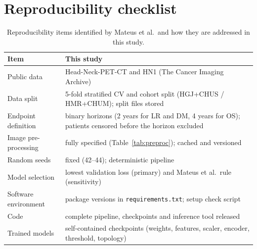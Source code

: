 \documentclass[11pt]{article}
\providecommand{\botrule}{\bottomrule}
\begin{document}
\section{Reproducibility checklist}

\begin{table}[!htb]
\centering\small
\caption{Reproducibility items identified by Mateus et al.\ and how they are addressed in this study.}\label{tab:checklist}
\begin{tabular}{@{}p{}p{}@{}}
\toprule
Item & This study \\
\midrule
Public data & Head-Neck-PET-CT and HN1 (The Cancer Imaging Archive) \\
Data split & 5-fold stratified CV and cohort split (HGJ+CHUS / HMR+CHUM); split files stored \\
Endpoint definition & binary horizons (2 years for LR and DM, 4 years for OS); patients censored before the horizon excluded \\
Image pre-processing & fully specified (Table~\ref{tab:preproc}); cached and versioned \\
Random seeds & fixed (42--44); deterministic pipeline \\
Model selection & lowest validation loss (primary) and Mateus et al.\ rule (sensitivity) \\
Software environment & package versions in \texttt{requirements.txt}; setup check script \\
Code & complete pipeline, checkpoints and inference tool released \\
Trained models & self-contained checkpoints (weights, features, scaler, encoder, threshold, topology) \\
\botrule
\end{tabular}
\end{table}
\end{document}
